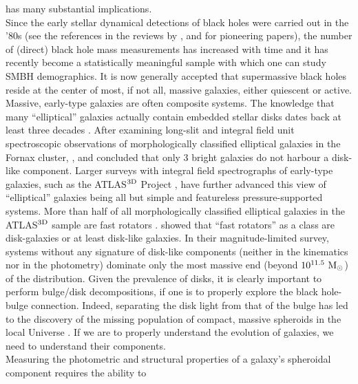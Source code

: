 \documentclass[preprint2]{emulateapj}
\begin{document}
has many substantial implications. \\
Since the early stellar dynamical detections of black holes were carried out in the '80s 
(see the references in the reviews by \citealt{kormendyrichstone1995}, \citealt{richstone1998} 
and \citealt{graham2015bulges} for pioneering papers), 
the number of (direct) black hole mass measurements has increased with time 
and it has recently become a statistically meaningful sample  
with which one can study SMBH demographics. 
It is now generally accepted that supermassive black holes reside at the center of most, if not all, 
massive galaxies, either quiescent or active. \\
Massive, early-type galaxies are often composite systems. 
The knowledge that many ``elliptical'' galaxies actually contain embedded stellar disks dates back  
at least three decades  
\citep{capaccioli1987,carter1987,rixwhite1990,bender1990,scorzabender1990,nieto1991,rixwhite1992,scorzabender1995}. 
After examining long-slit and integral field unit spectroscopic observations of morphologically classified elliptical galaxies in the Fornax cluster, 
\cite{donofrio1995}, \cite{graham1998fornax} and \cite{scott2014} concluded that only 3 bright galaxies do not harbour a disk-like component.
Larger surveys with integral field spectrographs of early-type galaxies, such as the ATLAS$^{\rm 3D}$ Project \citep{cappellari2011}, 
have further advanced this view of ``elliptical'' galaxies being all but simple and featureless pressure-supported systems.
More than half of all morphologically classified elliptical galaxies in the ATLAS$^{\rm 3D}$ sample are fast rotators \citep{atlas3dIII-MNRAS}.
\cite{krajnovic2013} showed that ``fast rotators'' as a class are disk-galaxies or at least disk-like galaxies. 
In their magnitude-limited survey, systems 
without any signature of disk-like components (neither in the kinematics nor in the photometry) 
dominate only the most massive end (beyond $10^{11.5}~\rm M_\odot$) of the distribution. 
Given the prevalence of disks, it is clearly important to perform bulge/disk decompositions, 
if one is to properly explore the black hole-bulge connection. 
Indeed, separating the disk light from that of the bulge has led to the discovery of the missing population of compact, massive spheroids 
in the local Universe \citep{GDS2015}.
If we are to properly understand the evolution of galaxies, we need to understand their components.\\
Measuring the photometric and structural properties of a galaxy's spheroidal component requires the ability to 
\end{document}
